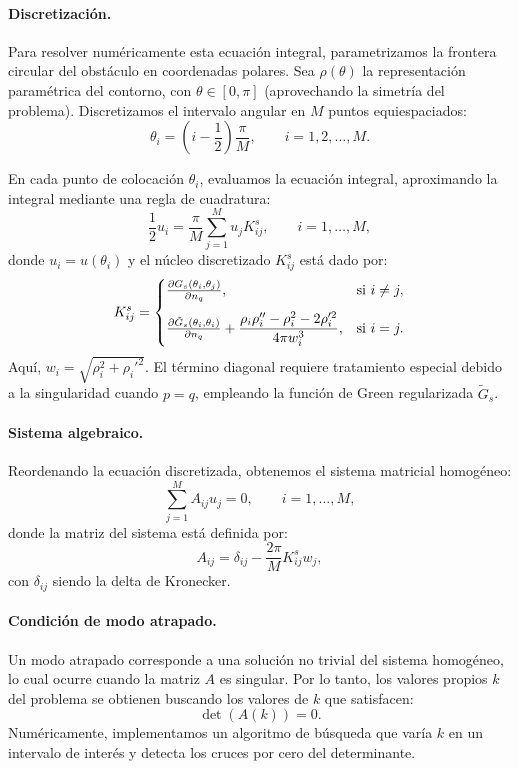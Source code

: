 \documentclass[11pt]{article}
\begin{document}
\paragraph{Discretización.} Para resolver numéricamente esta ecuación integral, parametrizamos la frontera circular del obstáculo en coordenadas polares. Sea $\rho(\theta)$ la representación paramétrica del contorno, con $\theta \in [0, \pi]$ (aprovechando la simetría del problema). Discretizamos el intervalo angular en $M$ puntos equiespaciados:
\begin{equation}
\theta_i = \left(i - \frac{1}{2}\right)\frac{\pi}{M}, \qquad i = 1, 2, \dots, M.
\end{equation}

En cada punto de colocación $\theta_i$, evaluamos la ecuación integral, aproximando la integral mediante una regla de cuadratura:
\begin{equation}
\frac{1}{2} u_i = \frac{\pi}{M} \sum_{j=1}^M u_j K^s_{ij}, \qquad i = 1, \dots, M,
\end{equation}
donde $u_i = u(\theta_i)$ y el núcleo discretizado $K^s_{ij}$ está dado por:
\begin{equation}
K^s_{ij} =
\begin{cases}
\pdv{G_s(\theta_i, \theta_j)}{n_q}, & \text{si } i \neq j,\\[0.8em]
\pdv{\tilde{G}_s(\theta_i, \theta_i)}{n_q} + \dfrac{\rho_i \rho_i'' - \rho_i^2 - 2\rho_i'^2}{4\pi w_i^3}, & \text{si } i=j.
\end{cases}
\end{equation}
Aquí, $w_i = \sqrt{\rho_i^2 + \rho_i'^2}$. El término diagonal requiere tratamiento especial debido a la singularidad cuando $p = q$, empleando la función de Green regularizada $\tilde{G}_s$.

\paragraph{Sistema algebraico.} Reordenando la ecuación discretizada, obtenemos el sistema matricial homogéneo:
\begin{equation}
\sum_{j=1}^M A_{ij} u_j = 0, \qquad i = 1, \dots, M,
\end{equation}
donde la matriz del sistema está definida por:
\begin{equation}
A_{ij} = \delta_{ij} - \frac{2\pi}{M} K^s_{ij} w_j,
\end{equation}
con $\delta_{ij}$ siendo la delta de Kronecker.

\paragraph{Condición de modo atrapado.} Un modo atrapado corresponde a una solución no trivial del sistema homogéneo, lo cual ocurre cuando la matriz $A$ es singular. Por lo tanto, los valores propios $k$ del problema se obtienen buscando los valores de $k$ que satisfacen:
\begin{equation}
\det(A(k)) = 0.
\end{equation}
Numéricamente, implementamos un algoritmo de búsqueda que varía $k$ en un intervalo de interés y detecta los cruces por cero del determinante.
\end{document}
